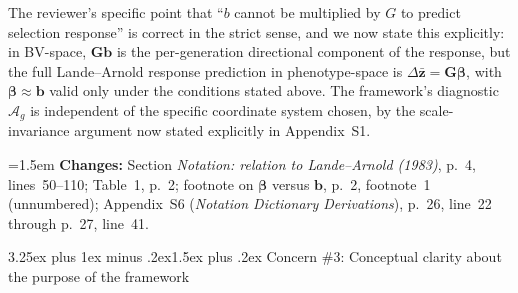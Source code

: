 \documentclass[11pt,a4paper]{article}
\makeatletter
\newcommand{\changesat}[1]{%
  \par\smallskip\noindent\hangindent=1.5em\hangafter=1
  \textbf{\color{ChangeColor}Changes:} \quad #1\par\medskip
}
\renewcommand{\subsection}{\@startsection{subsection}{2}{0pt}%
  {3.25ex plus 1ex minus .2ex}{1.5ex plus .2ex}%
  {\large\bfseries}}
\newcommand{\Ag}{\ensuremath{\mathcal{A}_{g}}\xspace}
\newcommand{\mat}[1]{\ensuremath{\mathbf{#1}}}
\newcommand{\vect}[1]{\ensuremath{\bm{#1}}}
\makeatother
\begin{document}
The reviewer's specific point that ``$b$ cannot be multiplied by $G$ to predict selection response'' is correct in the strict sense, and we now state this explicitly: in BV-space, $\mat{G}\vect{b}$ is the per-generation directional component of the response, but the full Lande--Arnold response prediction in phenotype-space is $\Delta\bar{\vect{z}} = \mat{G}\bm{\beta}$, with $\bm{\beta} \approx \vect{b}$ valid only under the conditions stated above. The framework's diagnostic $\Ag$ is independent of the specific coordinate system chosen, by the scale-invariance argument now stated explicitly in Appendix~S1.

\changesat{Section \textit{Notation: relation to Lande--Arnold (1983)}, p.~4, lines~50--110; Table~1, p.~2; footnote on $\bm{\beta}$ versus $\vect{b}$, p.~2, footnote~1 (unnumbered); Appendix~S6 (\textit{Notation Dictionary Derivations}), p.~26, line~22 through p.~27, line~41.}

\subsection{Concern \#3: Conceptual clarity about the purpose of the framework}
\end{document}
